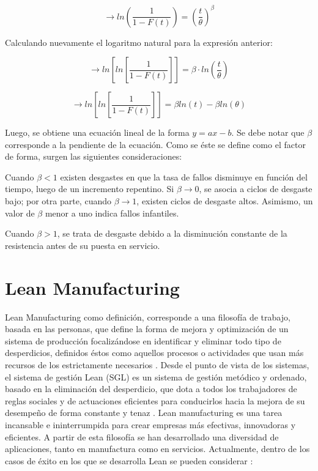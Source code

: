 \begin{equation}
\rightarrow ln\left( \frac{1}{1-F(t)} \right)=\left( \frac{t}{\theta}\right)^\beta 
\end{equation}

Calculando nuevamente el logaritmo natural para la expresión anterior:

\begin{equation}
\rightarrow ln\left[ln\left[\frac{1}{1-F(t)}\right]\right]=\beta\cdot ln\left(\frac{t}{\theta}\right)
\end{equation}

\begin{equation}
\rightarrow ln\left[ln\left[\frac{1}{1-F(t)}\right]\right]=\beta ln(t)-\beta ln(\theta)
\end{equation}

Luego, se obtiene una ecuación lineal de la forma $y=ax-b$. Se debe notar que $\beta$ corresponde a la pendiente de la ecuación. Como se éste se define como el factor de forma, surgen las siguientes consideraciones:

\begin{description}
\item Cuando $\beta<1$ existen desgastes en que la tasa de fallos disminuye en función del tiempo, luego de un incremento repentino. Si $\beta\rightarrow0$, se asocia a ciclos de desgaste bajo; por otra parte, cuando $\beta\rightarrow1$, existen ciclos de desgaste altos. Asimismo, un valor de $\beta$ menor a uno indica fallos infantiles.
\item Cuando $\beta>1$, se trata de desgaste debido a la disminución constante de la resistencia antes de su puesta en servicio.
\end{description}

\pagebreak

\section{Lean Manufacturing}

Lean Manufacturing como definición, corresponde a una filosofía de trabajo, basada en las personas, que define la forma de mejora y optimización de un sistema de producción focalizándose en identificar y eliminar todo tipo de desperdicios, definidos éstos como aquellos procesos o actividades que usan más recursos de los estrictamente necesarios \citep{hernandez2013}. Desde el punto de vista de los sistemas, el sistema de gestión Lean (SGL) es un sistema de gestión metódico y ordenado, basado en la eliminación del desperdicio, que dota a todos los trabajadores de reglas sociales y de actuaciones eficientes para conducirlos hacia la mejora de su desempeño de forma constante y tenaz \citep{leansis2017}. Lean manufacturing es una tarea incansable e ininterrumpida para crear empresas más efectivas, innovadoras y eficientes. A partir de esta filosofía se han desarrollado una diversidad de aplicaciones, tanto en manufactura como en servicios. Actualmente, dentro de los casos de éxito en los que se desarrolla Lean se pueden considerar \citep{socconini2019}:

